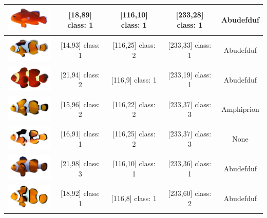 \begin{longtable}{|c|c|c|c|c|}
	\includegraphics[width=3cm]{gambar/dataset_validasi/Amphiprion14} & [18,89] class: 1 & [116,10] class: 1 & [233,28] class: 1 & Abudefduf \\ \hline
	\includegraphics[width=3cm]{gambar/dataset_validasi/Amphiprion15} & [14,93] class: 1 & [116,25] class: 2 & [233,33] class: 1 & Abudefduf \\ \hline
	\includegraphics[width=3cm]{gambar/dataset_validasi/Amphiprion16} & [21,94] class: 2 & [116,9] class: 1 & [233,19] class: 1 & Abudefduf \\ \hline
	\includegraphics[width=3cm]{gambar/dataset_validasi/Amphiprion17} & [15,96] class: 2 & [116,22] class: 2 & [233,37] class: 3 & Amphiprion \\ \hline
	\includegraphics[width=3cm]{gambar/dataset_validasi/Amphiprion18} & [16,91] class: 1 & [116,25] class: 2 & [233,37] class: 3 & None \\ \hline
	\includegraphics[width=3cm]{gambar/dataset_validasi/Amphiprion19} & [21,98] class: 3 & [116,10] class: 1 & [233,36] class: 1 & Abudefduf \\ \hline
	\includegraphics[width=3cm]{gambar/dataset_validasi/Amphiprion20} & [18,92] class: 1 & [116,8] class: 1 & [233,60] class: 2 & Abudefduf \\ \hline

\end{longtable}
